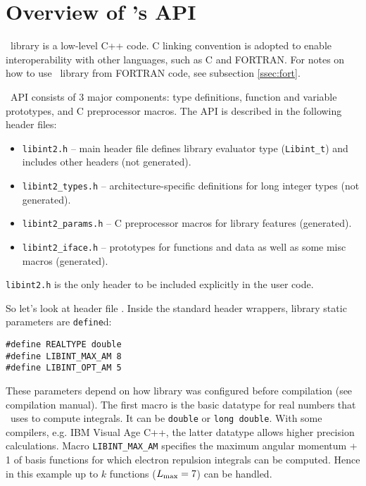 \documentclass[12pt]{article}
\begin{document}
\section{Overview of \LIBINT 's API}

\LIBINT\ library is a low-level C++ code. C linking convention is adopted to enable interoperability with other languages, such as C and FORTRAN.
For notes on how to use \LIBINT\ library from FORTRAN code, see subsection \ref{ssec:fort}.

\LIBINT\ API consists of 3 major components: type definitions, function and variable prototypes, and C preprocessor macros.
The API is described in the following header files:
\begin{itemize}
\item {\tt libint2.h} -- main header file defines library evaluator type ({\tt Libint\_t}) and includes other headers (not generated).
\item {\tt libint2_types.h} -- architecture-specific definitions for long integer types (not generated).
\item {\tt libint2_params.h} -- C preprocessor macros for library features (generated).
\item {\tt libint2_iface.h} -- prototypes for functions and data as well as some misc macros (generated).
\end{itemize}
{\tt libint2.h} is the only header to be included explicitly in the user code.

So let's look at header file \libinth. Inside the standard header wrappers,
library static parameters are {\tt define}d:
\begin{verbatim}
#define REALTYPE double
#define LIBINT_MAX_AM 8
#define LIBINT_OPT_AM 5
\end{verbatim}
These parameters depend on how library was configured before compilation (see compilation manual).
The first macro is the basic datatype for real numbers that \LIBINT\ uses
to compute integrals. It can be {\tt double} or {\tt long double}. With some compilers, e.g.
IBM Visual Age C++, the latter datatype allows higher precision calculations.
Macro {\tt LIBINT\_MAX\_AM} specifies the
maximum angular momentum + 1 of basis functions for which
electron repulsion integrals can be computed. Hence in this example up to $k$ functions ($L_{\rm max}=7$)
can be handled.
\end{document}
